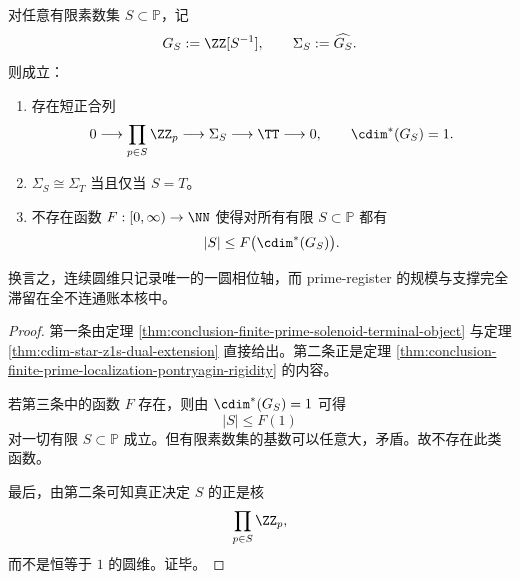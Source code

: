 \begin{proposition}\label{prop:conclusion-circle-dimension-prime-ledger-strict-orthogonality}
对任意有限素数集 \(S\subset\mathbb P\)，记
\[
G_S:=\ZZ[S^{-1}],
\qquad
\Sigma_S:=\widehat{G_S}.
\]
则成立：
\begin{enumerate}
  \item 存在短正合列
  \[
  0\longrightarrow \prod_{p\in S}\ZZ_p
  \longrightarrow \Sigma_S
  \longrightarrow \TT
  \longrightarrow 0,
  \qquad
  \cdim^\ast(G_S)=1.
  \]
  \item \(\Sigma_S\cong \Sigma_T\) 当且仅当 \(S=T\)。
  \item 不存在函数 \(F:[0,\infty)\to\NN\) 使得对所有有限 \(S\subset\mathbb P\) 都有
  \[
  |S|\le F\bigl(\cdim^\ast(G_S)\bigr).
  \]
\end{enumerate}
换言之，连续圆维只记录唯一的一圆相位轴，而 prime-register 的规模与支撑完全滞留在全不连通账本核中。
\end{proposition}

\begin{proof}
第一条由定理 \ref{thm:conclusion-finite-prime-solenoid-terminal-object} 与定理 \ref{thm:cdim-star-z1s-dual-extension} 直接给出。第二条正是定理 \ref{thm:conclusion-finite-prime-localization-pontryagin-rigidity} 的内容。

若第三条中的函数 \(F\) 存在，则由 \(\cdim^\ast(G_S)=1\) 可得
\[
|S|\le F(1)
\]
对一切有限 \(S\subset\mathbb P\) 成立。但有限素数集的基数可以任意大，矛盾。故不存在此类函数。

最后，由第二条可知真正决定 \(S\) 的正是核
\[
\prod_{p\in S}\ZZ_p,
\]
而不是恒等于 \(1\) 的圆维。证毕。
\end{proof}

